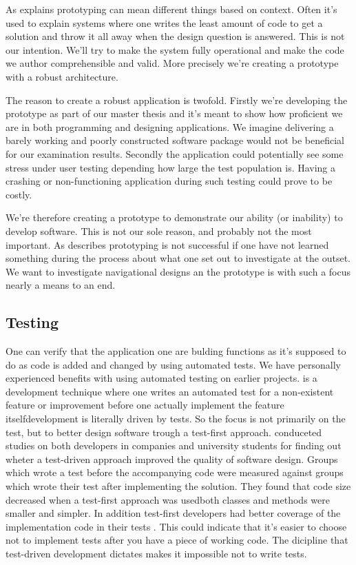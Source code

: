 As \citet[]{mcconnell04} explains prototyping can mean different things
based on context. Often it's used to explain systems where one writes the
least amount of code to get a solution and throw it all away when the design
question is answered. This is not our intention. We'll try to make the system
fully operational and make the code we author comprehensible and
valid. More precisely we're creating a  prototype
\cite[]{rudd96} with a robust architecture.

The reason to create a robust application is twofold. Firstly we're developing
the prototype as part of our master thesis and it's meant to show how
proficient we are in both programming and designing applications. We
imagine delivering a barely working and poorly constructed software package
would not be beneficial for our examination results.
Secondly the application could potentially see some stress under user testing
depending how large the test population is. Having a crashing or
non-functioning application during such testing could prove to be costly.

We're therefore creating a prototype to demonstrate our ability (or inability)
to develop software. This is not our sole reason, and probably not the most
important. As \citet[]{mayhew90} describes prototyping is not
successful if one have not learned something during the process about what one
set out to investigate at the outset. We want to investigate navigational
designs an the prototype is with such a focus nearly a means to an end.

\subsection{Testing}

One can verify that the application one are bulding functions as it's supposed
to do as code is added and changed by using automated tests.
We have personally experienced benefits with using automated testing on
earlier projects.
 is a development technique
where one writes an automated test for a non-existent feature or
improvement before one actually implement the feature itself\dash{}development
is literally driven by tests. So the focus is not primarily on the test, but
to better design software trough a test-first approach.
\citet{janzen08} conduceted studies
on both developers in companies and university students for finding out
wheter a test-driven approach improved the quality of software design.
Groups which wrote a test before the accompanying code were measured
against groups which wrote their test after implementing the solution.
They found that code size decreased when a test-first approach was
used\dash{}both classes and methods were smaller and simpler. In addition
test-first developers had better coverage of the implementation code in
their tests \citep[]{janzen08}. This could indicate that it's
easier to choose not to implement tests after you have a piece
of working code. The dicipline that test-driven development dictates
makes it impossible not to write tests.

